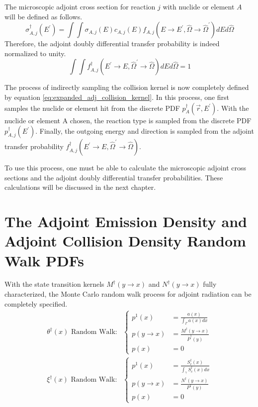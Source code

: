 The microscopic adjoint cross section for reaction $j$ with nuclide or element
$A$ will be defined as follows.
\begin{equation}
  \sigma_{A,j}^{\dagger}(E^{'}) = \int\int
  \sigma_{A,j}(E)c_{A,j}(E) 
    f_{A,j}(E \to E^{'},\hat{\Omega} \to \hat{\Omega}^{'}) dE d\hat{\Omega}
  \label{eq:adjoint_cross_section}
\end{equation}
Therefore, the adjoint doubly differential transfer probability is indeed 
normalized to unity.
\begin{equation}
  \int\int f_{A,j}^{\dagger}(E^{'} \to E,\hat{\Omega}^{'} \to \hat{\Omega})
  dE d\hat{\Omega} = 1
\end{equation}

The process of indirectly sampling the collision kernel is now completely 
defined by equation \ref{eq:expanded_adj_collision_kernel}. In this process,
one first samples the nuclide or element hit from the discrete PDF 
$p_A^{\dagger}(\vec{r},E^{'})$. With the nuclide or element A chosen, the reaction
type is sampled from the discrete PDF $p_{A,j}^{\dagger}(E^{'})$. Finally, the 
outgoing energy and direction is sampled from the adjoint transfer probability
$f_{A,j}^{\dagger}(E^{'} \to E,\hat{\Omega}^{'} \to \hat{\Omega})$. 

To use this process, one must be able to calculate the microscopic adjoint
cross sections and the adjoint doubly differential transfer probabilities. 
These calculations will be discussed in the next chapter. 

\section{The Adjoint Emission Density and Adjoint Collision Density Random Walk PDFs}
With the state transition kernels $M^{\dagger}(y \to x)$ and 
$N^{\dagger}(y \to x)$ fully characterized, the Monte Carlo random walk process
for adjoint radiation can be completely specified. 
\begin{align}
  \theta^{\dagger}(x)\text{ Random Walk:}&
  \begin{cases}
    p^1(x) & = \frac{a(x)}{\int_{\Gamma} a(x)dx} \\
    p(y \to x) & = \frac{M^{\dagger}(y \to x)}{\overline{P}^{\dagger}(y)} \\
    p(x) & = 0
  \end{cases}
  \label{eq:mc_random_walk_adj_emission_dens} \\
  \xi^{\dagger}(x)\text{ Random Walk:}&
  \begin{cases}
    p^1(x) & = \frac{S_c^{\dagger}(x)}{\int_{\gamma} S_c^{\dagger}(x)dx} \\
    p(y \to x) & = \frac{N^{\dagger}(y \to x)}{P^{\dagger}(y)} \\
    p(x) & = 0
  \end{cases}
  \label{eq:mc_random_walk_adj_collision_dens}
\end{align}

